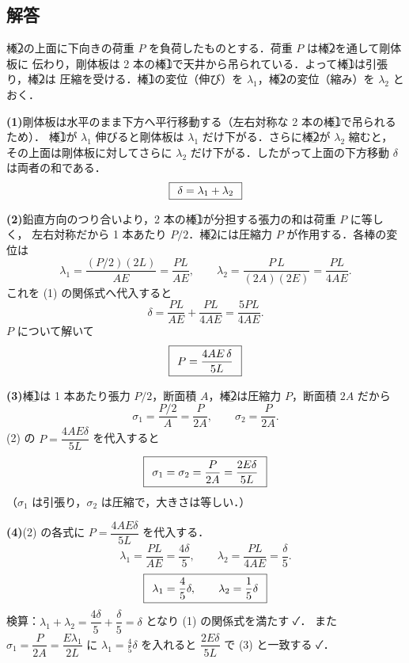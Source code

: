 \documentclass[11pt,a4paper]{article}
\begin{document}
\subsection*{解答}

棒\textcircled{2}の上面に下向きの荷重 $P$ を負荷したものとする．荷重 $P$ は棒\textcircled{2}を通して剛体板に
伝わり，剛体板は 2 本の棒\textcircled{1}で天井から吊られている．よって棒\textcircled{1}は引張り，棒\textcircled{2}は
圧縮を受ける．棒\textcircled{1}の変位（伸び）を $\lambda_1$，棒\textcircled{2}の変位（縮み）を $\lambda_2$ とおく．

\medskip
\noindent\textbf{(1)}\quad 剛体板は水平のまま下方へ平行移動する（左右対称な 2 本の棒\textcircled{1}で吊られるため）．
棒\textcircled{1}が $\lambda_1$ 伸びると剛体板は $\lambda_1$ だけ下がる．さらに棒\textcircled{2}が $\lambda_2$ 縮むと，
その上面は剛体板に対してさらに $\lambda_2$ だけ下がる．したがって上面の下方移動 $\delta$ は両者の和である．
\[
  \boxed{\,\;\delta = \lambda_1 + \lambda_2\;\,}
\]

\medskip
\noindent\textbf{(2)}\quad 鉛直方向のつり合いより，2 本の棒\textcircled{1}が分担する張力の和は荷重 $P$ に等しく，
左右対称だから 1 本あたり $P/2$．棒\textcircled{2}には圧縮力 $P$ が作用する．各棒の変位は
\[
  \lambda_1 = \frac{(P/2)(2L)}{A E} = \frac{PL}{AE},\qquad
  \lambda_2 = \frac{P\,L}{(2A)(2E)} = \frac{PL}{4AE}.
\]
これを (1) の関係式へ代入すると
\[
  \delta = \frac{PL}{AE} + \frac{PL}{4AE} = \frac{5PL}{4AE}.
\]
$P$ について解いて
\[
  \boxed{\,\;P = \frac{4AE\,\delta}{5L}\;\,}
\]

\medskip
\noindent\textbf{(3)}\quad 棒\textcircled{1}は 1 本あたり張力 $P/2$，断面積 $A$，棒\textcircled{2}は圧縮力 $P$，断面積 $2A$ だから
\[
  \sigma_1 = \frac{P/2}{A} = \frac{P}{2A},\qquad
  \sigma_2 = \frac{P}{2A}.
\]
(2) の $P=\dfrac{4AE\delta}{5L}$ を代入すると
\[
  \boxed{\,\;\sigma_1 = \sigma_2 = \frac{P}{2A} = \frac{2E\delta}{5L}\;\,}
\]
（$\sigma_1$ は引張り，$\sigma_2$ は圧縮で，大きさは等しい．）

\medskip
\noindent\textbf{(4)}\quad (2) の各式に $P=\dfrac{4AE\delta}{5L}$ を代入する．
\[
  \lambda_1 = \frac{PL}{AE} = \frac{4\delta}{5},\qquad
  \lambda_2 = \frac{PL}{4AE} = \frac{\delta}{5}.
\]
\[
  \boxed{\,\;\lambda_1 = \frac{4}{5}\delta,\qquad \lambda_2 = \frac{1}{5}\delta\;\,}
\]
検算：$\lambda_1 + \lambda_2 = \dfrac{4\delta}{5}+\dfrac{\delta}{5} = \delta$ となり (1) の関係式を満たす ✓．
また $\sigma_1 = \dfrac{P}{2A} = \dfrac{E\lambda_1}{2L}$ に $\lambda_1=\tfrac{4}{5}\delta$ を入れると $\dfrac{2E\delta}{5L}$ で (3) と一致する ✓．
\end{document}
